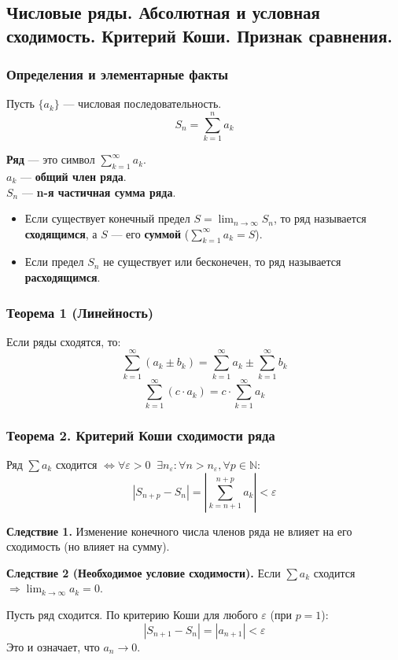 \subsection{Числовые ряды. Абсолютная и условная сходимость. Критерий Коши. Признак сравнения.}

\subsubsection*{Определения и элементарные факты}
Пусть $\{a_k\}$ — числовая последовательность.
\[ S_n = \sum^n_{k=1}a_k \]
\begin{tcolorbox}[title=Определения]
    \textbf{Ряд} — это символ $\sum^\infty_{k=1} a_k$. \\
    $a_k$ — \textbf{общий член ряда}.\\
    $S_n$ — \textbf{n-я частичная сумма ряда}.\\
    
    \begin{itemize}
        \item Если существует конечный предел $S = \lim_{n\to\infty} S_n$, то ряд называется \textbf{сходящимся}, а $S$ — его \textbf{суммой} ($\sum_{k=1}^\infty a_k = S$).
        \item Если предел $S_n$ не существует или бесконечен, то ряд называется \textbf{расходящимся}.
    \end{itemize}
\end{tcolorbox}

\subsubsection*{Теорема 1 (Линейность)}
Если ряды сходятся, то:
\[ \sum_{k=1}^\infty (a_k \pm b_k) = \sum_{k=1}^\infty a_k \pm \sum_{k=1}^\infty b_k \]
\[ \sum_{k=1}^\infty (c \cdot a_k) = c \cdot \sum_{k=1}^\infty a_k \]

\subsubsection*{Теорема 2. Критерий Коши сходимости ряда}
Ряд $\sum a_k$ сходится $\Leftrightarrow \forall \varepsilon > 0\;\; \exists n_\varepsilon : \forall n > n_\varepsilon, \forall p \in \mathbb{N}$:
\[ |S_{n+p} - S_n| = \left| \sum_{k=n+1}^{n+p} a_k \right| < \varepsilon \]

\textbf{Следствие 1.} Изменение конечного числа членов ряда не влияет на его сходимость (но влияет на сумму).

\textbf{Следствие 2 (Необходимое условие сходимости).}
Если $\sum a_k$ сходится $\Rightarrow \lim_{k\to\infty} a_k = 0$.
\begin{tcolorbox}[title=Доказательство]
    Пусть ряд сходится. По критерию Коши для любого $\varepsilon$ (при $p=1$):
    \[ |S_{n+1} - S_n| = |a_{n+1}| < \varepsilon \]
    Это и означает, что $a_n \to 0$.
\end{tcolorbox}

